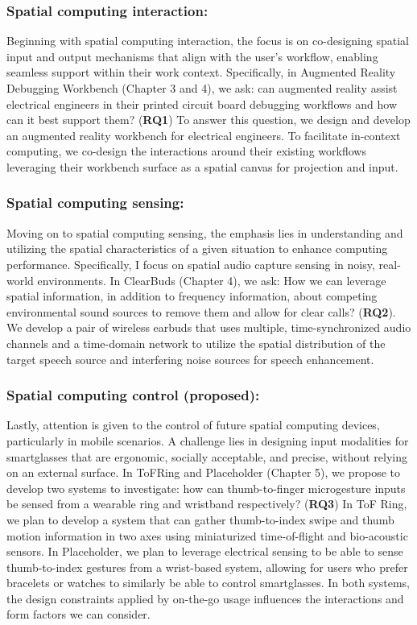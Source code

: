 \documentclass [11pt, proquest] {uwthesis}[2020/02/24]
\begin{document}
\subsubsection{Spatial computing interaction:} Beginning with spatial computing interaction, the focus is on co-designing spatial input and output mechanisms that align with the user's workflow, enabling seamless support within their work context. Specifically, in Augmented Reality Debugging Workbench (Chapter 3 and 4), we ask: can augmented reality assist electrical engineers in their printed circuit board debugging workflows and how can it best support them? (\textbf{RQ1}) To answer this question, we design and develop an augmented reality workbench for electrical engineers. To facilitate in-context computing, we co-design the interactions around their existing workflows leveraging their workbench surface as a spatial canvas for projection and input.

\subsubsection{Spatial computing sensing:} Moving on to spatial computing sensing, the emphasis lies in understanding and utilizing the spatial characteristics of a given situation to enhance computing performance. Specifically, I focus on spatial audio capture sensing in noisy, real-world environments. In ClearBuds (Chapter 4), we ask: How we can leverage spatial information, in addition to frequency information, about competing environmental sound sources to remove them and allow for clear calls? (\textbf{RQ2}). We develop a pair of wireless earbuds that uses multiple, time-synchronized audio channels and a time-domain network to utilize the spatial distribution of the target speech source and interfering noise sources for speech enhancement.

\subsubsection{Spatial computing control (proposed):} Lastly, attention is given to the control of future spatial computing devices, particularly in mobile scenarios. A challenge lies in designing input modalities for smartglasses that are ergonomic, socially acceptable, and precise, without relying on an external surface. In ToFRing and Placeholder (Chapter 5), we propose to develop two systems to investigate: how can thumb-to-finger microgesture inputs be sensed from a wearable ring and wristband respectively? (\textbf{RQ3}) In ToF Ring, we plan to develop a system that can gather thumb-to-index swipe and thumb motion information in two axes using miniaturized time-of-flight and bio-acoustic sensors. In Placeholder, we plan to leverage electrical sensing to be able to sense thumb-to-index gestures from a wrist-based system, allowing for users who prefer bracelets or watches to similarly be able to control smartglasses. In both systems, the design constraints applied by on-the-go usage influences the interactions and form factors we can consider.
\end{document}
